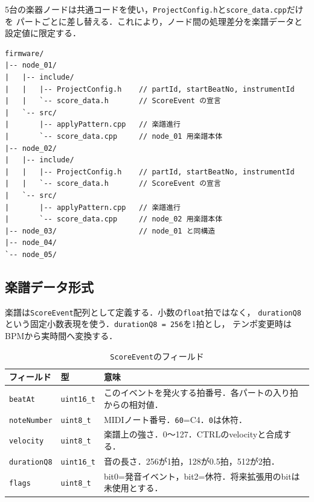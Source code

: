 \documentclass[uplatex,dvipdfmx]{jlreq}
\newcommand{\code}[1]{\texttt{#1}}
\begin{document}
5台の楽器ノードは共通コードを使い，\code{ProjectConfig.h}と\code{score\_data.cpp}だけを
パートごとに差し替える．これにより，ノード間の処理差分を楽譜データと設定値に限定する．

\begin{verbatim}
firmware/
|-- node_01/
|   |-- include/
|   |   |-- ProjectConfig.h    // partId, startBeatNo, instrumentId
|   |   `-- score_data.h       // ScoreEvent の宣言
|   `-- src/
|       |-- applyPattern.cpp   // 楽譜進行
|       `-- score_data.cpp     // node_01 用楽譜本体
|-- node_02/
|   |-- include/
|   |   |-- ProjectConfig.h    // partId, startBeatNo, instrumentId
|   |   `-- score_data.h       // ScoreEvent の宣言
|   `-- src/
|       |-- applyPattern.cpp   // 楽譜進行
|       `-- score_data.cpp     // node_02 用楽譜本体
|-- node_03/                   // node_01 と同構造
|-- node_04/
`-- node_05/
\end{verbatim}

\subsection{楽譜データ形式}

楽譜は\code{ScoreEvent}配列として定義する．小数の\code{float}拍ではなく，
\code{durationQ8}という固定小数表現を使う．\code{durationQ8 = 256}を1拍とし，
テンポ変更時はBPMから実時間へ変換する．

\begin{table}[H]
\centering
\caption{\code{ScoreEvent}のフィールド}
\label{tab:saito-scoreevent}
\begin{tabular}{p{}p{}p{}}
\toprule
\textbf{フィールド} & \textbf{型} & \textbf{意味} \\
\midrule
\code{beatAt} & \code{uint16\_t} & このイベントを発火する拍番号．各パートの入り拍からの相対値．\\
\code{noteNumber} & \code{uint8\_t} & MIDIノート番号．\code{60}=C4．\code{0}は休符．\\
\code{velocity} & \code{uint8\_t} & 楽譜上の強さ．0〜127．CTRLのvelocityと合成する．\\
\code{durationQ8} & \code{uint16\_t} & 音の長さ．256が1拍，128が0.5拍，512が2拍．\\
\code{flags} & \code{uint8\_t} & bit0=発音イベント，bit2=休符．将来拡張用のbitは未使用とする．\\
\bottomrule
\end{tabular}
\end{table}
\end{document}
